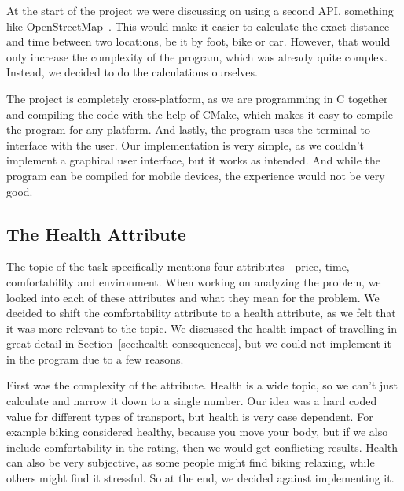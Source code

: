 At the start of the project we were discussing on using a second API, something like OpenStreetMap~\cite{openstreetmap}.
This would make it easier to calculate the exact distance and time between two locations, be it by foot, bike or car.
However, that would only increase the complexity of the program, which was already quite complex.
Instead, we decided to do the calculations ourselves.

The project is completely cross-platform, as we are programming in C together and compiling the code with the help of
CMake, which makes it easy to compile the program for any platform.
And lastly, the program uses the terminal to interface with the user.
Our implementation is very simple, as we couldn't implement a graphical user interface, but it works as intended.
And while the program can be compiled for mobile devices, the experience would not be very good.

\subsection{The Health Attribute}\label{subsec:health-attribute}

The topic of the task specifically mentions four attributes - price, time, comfortability and environment.
When working on analyzing the problem, we looked into each of these attributes and what they mean for the problem.
We decided to shift the comfortability attribute to a health attribute, as we felt that it was more relevant to the
topic.
We discussed the health impact of travelling in great detail in Section~\ref{sec:health-consequences}, but we could not
implement it in the program due to a few reasons.

First was the complexity of the attribute.
Health is a wide topic, so we can't just calculate and narrow it down to a single number.
Our idea was a hard coded value for different types of transport, but health is very case dependent.
For example biking considered healthy, because you move your body, but if we also include comfortability in the rating,
then we would get conflicting results.
Health can also be very subjective, as some people might find biking relaxing, while others might find it stressful.
So at the end, we decided against implementing it.
